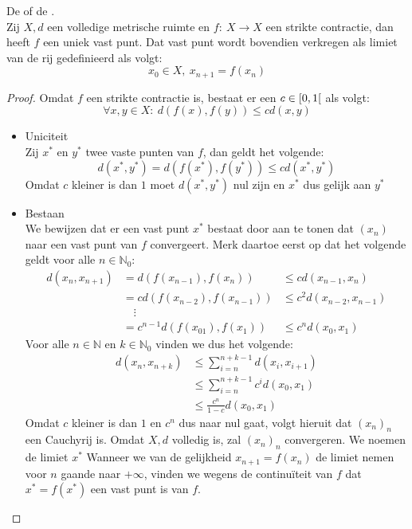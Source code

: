 \documentclass[main.tex]{subfiles}
\begin{document}
\begin{bst}
  De  of de .\\
  Zij $X,d$ een volledige metrische ruimte en $f:\ X \rightarrow X$ een strikte contractie, dan heeft $f$ een uniek vast punt.
  Dat vast punt wordt bovendien verkregen als limiet van de rij gedefinieerd als volgt:
  \[ x_{0}\in X,\ x_{n+1} = f(x_{n}) \]

  \begin{proof}
    Omdat $f$ een strikte contractie is, bestaat er een $c\in\interval[open right]{0}{1}$ als volgt:
    \[ \forall x,y\in X:\ d\left(f(x),f(y)\right) \le cd(x,y) \]
    \begin{itemize}
    \item Uniciteit\\
      Zij $x^{*}$ en $y^{*}$ twee vaste punten van $f$, dan geldt het volgende:
      \[ d(x^{*},y^{*}) = d\left(f(x^{*}),f(y^{*})\right) \le cd(x^{*},y^{*}) \]
      Omdat $c$ kleiner is dan $1$ moet $d(x^{*},y^{*})$ nul zijn en $x^{*}$ dus gelijk aan $y^{*}$
    \item Bestaan\\
      We bewijzen dat er een vast punt $x^{*}$ bestaat door aan te tonen dat $(x_{n})$ naar een vast punt van $f$ convergeert.
      Merk daartoe eerst op dat het volgende geldt voor alle $n\in \mathbb{N}_{0}$:
      \begin{align*}
        d(x_{n},x_{n+1})
        &= d(f(x_{n-1}),f(x_{n}))
        &\le cd(x_{n-1},x_{n})\\
        &= cd(f(x_{n-2}),f(x_{n-1}))
        &\le c^{2}d(x_{n-2},x_{n-1})\\
        &\quad\vdots\\
        &= c^{n-1}d(f(x_{01}),f(x_{1})) &\le c^{n}d(x_{0},x_{1})
      \end{align*}
      Voor alle $n\in \mathbb{N}$ en $k\in \mathbb{N}_{0}$ vinden we dus het volgende:
      \begin{align*}
      d(x_{n},x_{n+k})
      &\le \sum_{i=n}^{n+k-1}d(x_{i},x_{i+1})\\
      &\le \sum_{i=n}^{n+k-1}c^{i}d(x_{0},x_{1})\\
      &\le \frac{c^{n}}{1-c} d(x_{0},x_{1})
      \end{align*}
      Omdat $c$ kleiner is dan $1$ en $c^{n}$ dus naar nul gaat, volgt hieruit dat $(x_{n})_{n}$ een Cauchyrij is.
      Omdat $X,d$ volledig is, zal $(x_{n})_{n}$ convergeren.
      We noemen de limiet $x^{*}$
      Wanneer we van de gelijkheid $x_{n+1}=f(x_{n})$ de limiet nemen voor $n$ gaande naar $+\infty$, vinden we wegens de continu\"iteit van $f$ dat $x^{*}=f(x^{*})$ een vast punt is van $f$.
    \end{itemize}
  \end{proof}
\end{bst}
\end{document}
